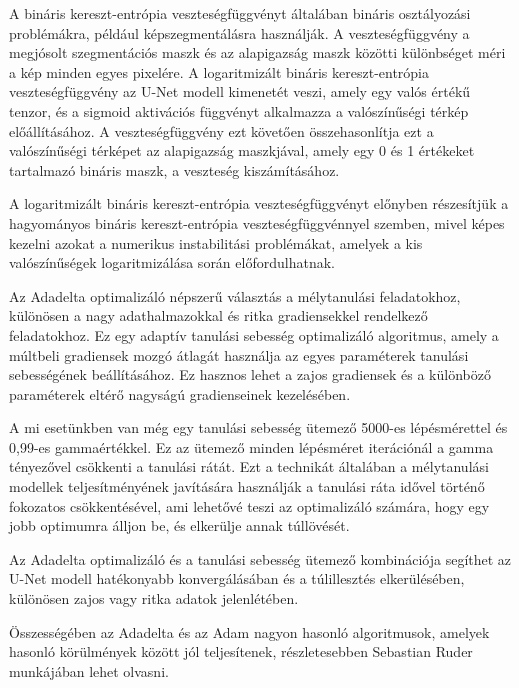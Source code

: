 \documentclass[12pt,a4]{article}
\begin{document}
        A bináris kereszt-entrópia veszteségfüggvényt általában bináris osztályozási problémákra, például képszegmentálásra használják. A veszteségfüggvény a megjósolt szegmentációs maszk és az alapigazság maszk közötti különbséget méri a kép minden egyes pixelére. A logaritmizált bináris kereszt-entrópia veszteségfüggvény  az U-Net modell kimenetét veszi, amely egy valós értékű tenzor, és a sigmoid aktivációs függvényt alkalmazza a valószínűségi térkép előállításához. A veszteségfüggvény ezt követően összehasonlítja ezt a valószínűségi térképet az alapigazság maszkjával, amely egy 0 és 1 értékeket tartalmazó bináris maszk, a veszteség kiszámításához.

        A logaritmizált bináris kereszt-entrópia veszteségfüggvényt előnyben részesítjük a hagyományos bináris kereszt-entrópia veszteségfüggvénnyel szemben, mivel képes kezelni azokat a numerikus instabilitási problémákat, amelyek a kis valószínűségek logaritmizálása során előfordulhatnak.

        Az Adadelta optimalizáló népszerű választás a mélytanulási feladatokhoz, különösen a nagy adathalmazokkal és ritka gradiensekkel rendelkező feladatokhoz. Ez egy adaptív tanulási sebesség optimalizáló algoritmus, amely a múltbeli gradiensek mozgó átlagát használja az egyes paraméterek tanulási sebességének beállításához. Ez hasznos lehet a zajos gradiensek és a különböző paraméterek eltérő nagyságú gradienseinek kezelésében.

        A mi esetünkben van még egy tanulási sebesség ütemező 5000-es lépésmérettel és 0,99-es gammaértékkel. Ez az ütemező minden lépésméret iterációnál a gamma tényezővel csökkenti a tanulási rátát. Ezt a technikát általában a mélytanulási modellek teljesítményének javítására használják a tanulási ráta idővel történő fokozatos csökkentésével, ami lehetővé teszi az optimalizáló számára, hogy egy jobb optimumra álljon be, és elkerülje annak túllövését.

        Az Adadelta optimalizáló és a tanulási sebesség ütemező kombinációja segíthet az U-Net modell hatékonyabb konvergálásában és a túlillesztés elkerülésében, különösen zajos vagy ritka adatok jelenlétében.
        
        Összességében az Adadelta és az Adam nagyon hasonló algoritmusok, amelyek hasonló körülmények között jól teljesítenek, részletesebben Sebastian Ruder \cite{ruder} munkájában lehet olvasni.
        \\
\end{document}
